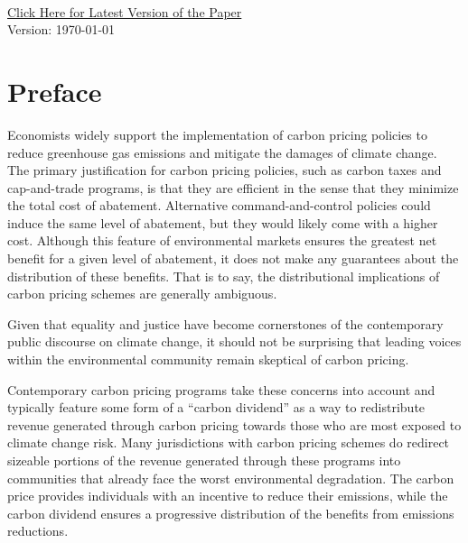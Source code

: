 ~

\newpage

\begin{center}
	\Large \href{https://github.com/EAPerry/seniorThesis/raw/main/Writing/Draft/main.pdf}{Click Here for Latest Version of the Paper}\\
	\normalsize Version: \today
\end{center}


\section*{Preface}

Economists widely support the implementation of carbon pricing policies to reduce greenhouse gas emissions and mitigate the damages of climate change. The primary justification for carbon pricing policies, such as carbon taxes and cap-and-trade programs, is that they are efficient in the sense that they minimize the total cost of abatement. Alternative command-and-control policies could induce the same level of abatement, but they would likely come with a higher cost. Although this feature of environmental markets ensures the greatest net benefit for a given level of abatement, it does not make any guarantees about the distribution of these benefits. That is to say, the distributional implications of carbon pricing schemes are generally ambiguous. 

Given that equality and justice have become cornerstones of the contemporary public discourse on climate change, it should not be surprising that leading voices within the environmental community remain skeptical of carbon pricing. 

Contemporary carbon pricing programs take these concerns into account and typically feature some form of a ``carbon dividend'' as a way to redistribute revenue generated through carbon pricing towards those who are most exposed to climate change risk. Many jurisdictions with carbon pricing schemes do redirect sizeable portions of the revenue generated through these programs into communities that already face the worst environmental degradation. The carbon price provides individuals with an incentive to reduce their emissions, while the carbon dividend ensures a progressive distribution of the benefits from emissions reductions. 

